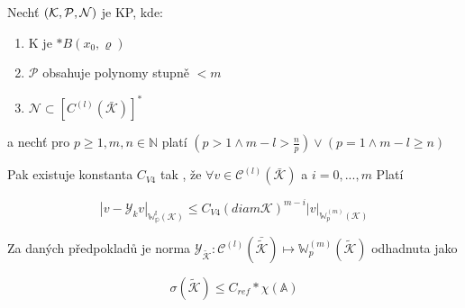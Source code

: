 \documentclass[../main.tex]{subfiles}
\begin{document}
\begin{theorem}
    Nechť $(\mathcal{K}, \mathcal{P}, \mathcal{N})$ je KP, kde:
    \begin{enumerate}
        \item K je $*B(x_0,\varrho)$
        \item $\mathcal{P}$ obsahuje polynomy stupně $< m$
        \item $\mathcal{N} \subset \left[C^{(l)}(\bar{\mathcal{K}})\right]^*$   
    \end{enumerate}

    a nechť pro $p\geq 1, m,n\in \mathbb{N}$ platí $(p>1 \wedge m-l > \frac{n}{p}) \vee (p=1 \wedge m-l \geq n)$

    Pak existuje konstanta $C_{V4}$ tak , že $\forall v \in \mathcal{C}^{(l)} (\bar{\mathcal{K}})$ a $i=0,...,m$ Platí


    \begin{equation*}
        |v - \mathcal{Y}_k v|_{\mathbb{W_p^{i}}(\mathcal{K})} \leq C_{V4} (diam \mathcal{K})^{m-i} |v|_{\mathbb{W}_p^{(m)} (\mathcal{K})}
    \end{equation*} 


\end{theorem}


\begin{claim}
    Za daných předpokladů  je norma $\mathcal{Y}_{\tilde{\mathcal{K}}} : \mathcal{C}^{(l)}(\bar{\tilde{\mathcal{K}}}) \mapsto \mathbb{W}_p^{(m)}(\tilde{\mathcal{K}})$ odhadnuta jako

    \begin{equation*}
        \sigma(\tilde{\mathcal{K}}) \leq C_{ref} * \chi(\mathbb{A})
    \end{equation*}
\end{claim}
\end{document}
